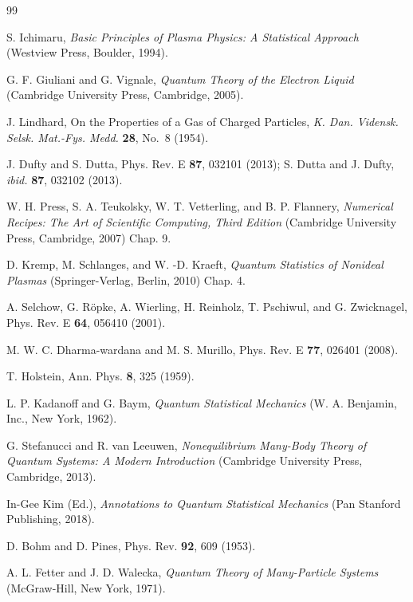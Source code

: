 \documentclass[aps,showkeys,noshowpacs,superscriptaddress,pre,preprint]{revtex4-2}
\begin{document}
\begin{thebibliography}{99}

 S. Ichimaru, \textit{Basic Principles of Plasma Physics: A Statistical Approach}
(Westview Press, Boulder, 1994).

 G. F. Giuliani and G. Vignale, \textit{Quantum Theory of the Electron Liquid} (Cambridge University Press, Cambridge, 2005).

 J. Lindhard, On the Properties of a Gas of Charged Particles,
\textit{K. Dan. Vidensk. Selsk. Mat.-Fys. Medd.} \textbf{28}, No.~8 (1954).

 J. Dufty and S. Dutta, Phys. Rev. E \textbf{87}, 032101 (2013); S. Dutta and J. Dufty, \textit{ibid.} \textbf{87}, 032102 (2013).

 W. H. Press, S. A. Teukolsky, W. T. Vetterling, and B. P. Flannery, 
\textit{Numerical Recipes: The Art of Scientific Computing, Third Edition} (Cambridge University Press, Cambridge, 2007) Chap. 9.

 D. Kremp, M. Schlanges, and W. -D. Kraeft, \textit{Quantum Statistics of Nonideal Plasmas} (Springer-Verlag, Berlin, 2010) Chap. 4.

 A. Selchow, G. R\"opke, A. Wierling, H. Reinholz, T. Pschiwul, and G. Zwicknagel, 
Phys. Rev. E \textbf{64}, 056410 (2001).

 M. W. C. Dharma-wardana and M. S. Murillo, Phys. Rev. E \textbf{77}, 026401 (2008).

 T. Holstein, Ann. Phys. \textbf{8}, 325 (1959).

 L. P. Kadanoff and G. Baym, \textit{Quantum Statistical Mechanics}
(W. A. Benjamin, Inc., New York, 1962).

 G. Stefanucci and R. van Leeuwen,
\textit{Nonequilibrium Many-Body Theory of Quantum Systems: A Modern Introduction}
(Cambridge University Press, Cambridge, 2013).

 In-Gee Kim (Ed.), \textit{Annotations to Quantum Statistical Mechanics}
(Pan Stanford Publishing, 2018).

 D. Bohm and D. Pines, Phys. Rev. \textbf{92}, 609 (1953).

 A. L. Fetter and J. D. Walecka, \textit{Quantum Theory of Many-Particle Systems} 
(McGraw-Hill, New York, 1971).


\end{thebibliography}
\end{document}
